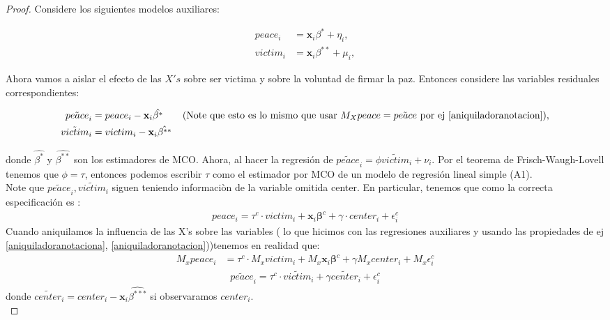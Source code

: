 \documentclass[a4paper, answers, addpoints, 11pt]{exam}
\begin{document}
\begin{enumerate} [resume]
\begin{mdframed}
\begin{proof}
Considere los siguientes modelos auxiliares:

\begin{align*}
    peace_i &= \textbf{x}_i \beta^{*} + \eta_i, \\
    victim_i &= \textbf{x}_i\beta^{**} + \mu_i,
\end{align*}

\noindent Ahora vamos a aislar el efecto de las $X's$ sobre ser victima y sobre la voluntad de firmar la paz. Entonces considere las variables residuales correspondientes:

\begin{align*}
    \tilde{peace}_i &= peace_i - \textbf{x}_i \hat{\beta^{*}} \qquad \text{(Note que esto es lo mismo que usar $M_X peace= \tilde{peace}$ por ej \ref{aniquiladoranotacion})}, \\
    \tilde{victim}_i &= victim_i - \textbf{x}_i \hat{\beta^{**}} 
\end{align*}

\noindent donde \( \hat{\beta^{*}} \) y \( \hat{\beta^{**}} \) son los estimadores de MCO. Ahora, al hacer la regresión de $\tilde{peace}_i= \phi \tilde{victim}_i+\nu_i $. Por el teorema de Frisch-Waugh-Lovell tenemos que $\phi = \tau$, entonces podemos escribir $\tau$ como el estimador por MCO de un modelo de regresión lineal simple (A1).\\

Note que $\tilde{peace}_i, \tilde{victim}_i$ siguen teniendo informaciòn de la variable omitida center. En particular, tenemos que como la correcta especificación es : 
    \begin{gather*}
         peace_i = \tau^{c} \cdot victim_i + \textbf{x}_i\boldsymbol\beta^{c} + \gamma \cdot center_i + \epsilon^{c}_i
         \end{gather*}
   Cuando aniquilamos la influencia de las X's sobre las variables ( lo que hicimos con las regresiones auxiliares y usando las propiedades de ej \ref{aniquiladoranotaciona}, \ref{aniquiladoranotacion}))tenemos en realidad que:
     \begin{align*}
        M_x peace_i &= \tau^{c} \cdot M_x victim_i + M_x \textbf{x}_i\boldsymbol\beta^{c} + \gamma  M_x center_i + M_x\epsilon^{c}_i 
     \end{align*}
   \begin{gather}\label{aniquilacionx}
        \tilde{peace}_i = \tau^{c} \cdot \tilde{victim}_i +  \gamma  \tilde{center}_i + \epsilon^{c}_i 
    \end{gather}
    donde $\tilde{center}_i=center_i - \textbf{x}_i \hat{\beta^{***}}$ si observaramos $center_i$.\\
       

\end{proof}
\end{mdframed}
\end{enumerate}
\end{document}
